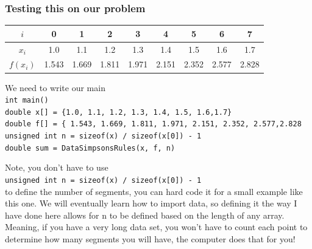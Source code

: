 \documentclass{if-beamer}
\begin{document}
\begin{frame}
	\frametitle{Testing this on our problem}
		\begin{table}
		\begin{tabular}{c| c c c c c c c c}
			$i$ &0& 1&2&3&4&5&6&7 \\
			\hline
			$x_i$& 1.0 &1.1&1.2&1.3&1.4&1.5&1.6&1.7\\
			$f(x_i)$&1.543&1.669&1.811&1.971&2.151&2.352&2.577&2.828\\			
		\end{tabular}
	\end{table}
	We need to write our main \\
	\texttt{int main()}\\
	\texttt{double x[] = \{1.0, 1.1, 1.2, 1.3, 1.4, 1.5, 1.6,1.7\}}\\
	\texttt{double f[] = \{ 1.543, 1.669, 1.811, 1.971, 2.151, 2.352, 2.577,2.828} \\
	\texttt{unsigned int n = sizeof(x) / sizeof(x[0]) - 1}\\
	\texttt{double sum = DataSimpsonsRules(x, f, n)}\\\vspace{5pt}
	
	Note, you don't have to use\\ \texttt{\qquad \qquad unsigned int n = sizeof(x) / sizeof(x[0]) - 1}\\ to define the number of segments, you can hard code it for a small example like this one. We will eventually learn how to import data, so defining it the way I have done here allows for n to be defined based on the length of any array. Meaning, if you have a very long data set, you won't have to count each point to determine how many segments you will have, the computer does that for you!   
	
\end{frame}
\end{document}
